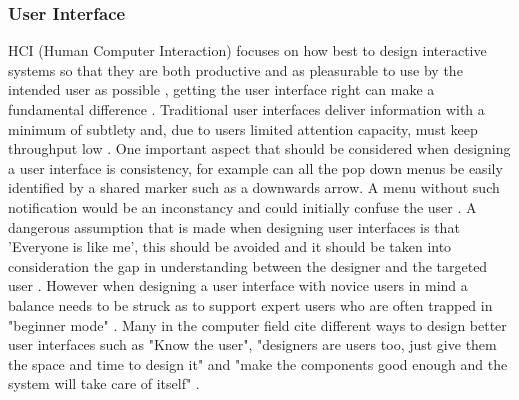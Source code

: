 \documentclass[12pt,a4paper]{article}
\begin{document}
\subsubsection{User Interface} 
HCI (Human Computer Interaction) focuses on how best to design interactive systems so that they are both productive and as pleasurable to use by the intended user as possible \cite{smith2006human}, getting the user interface right can make a fundamental difference \cite{ritter2014foundations1}. Traditional user interfaces deliver information with a minimum of subtlety and, due to users limited attention capacity, must keep throughput low \cite{bulling2016pervasive}.  One important aspect that should be considered when designing a user interface is consistency, for example can all the pop down menus be easily identified by a shared marker such as a downwards arrow. A menu without such notification would be an inconstancy and could initially confuse the user \cite{nielsen2014coordinating}. A dangerous assumption that is made when designing user interfaces is that 'Everyone is like me', this should be avoided and it should be taken into consideration the gap in understanding between the designer and the targeted user \cite{ritter2014foundations2}. However when designing a user interface with novice users in mind a balance needs to be struck as to support expert users who are often trapped in "beginner mode" \cite{cockburn2015supporting}. Many in the computer field cite different ways to design better user interfaces such as "Know the user", "designers are users too, just give them the space and time to design it" and "make the components good enough and the system will take care of itself" \cite{card2017psychology}.

   
\end{document}
